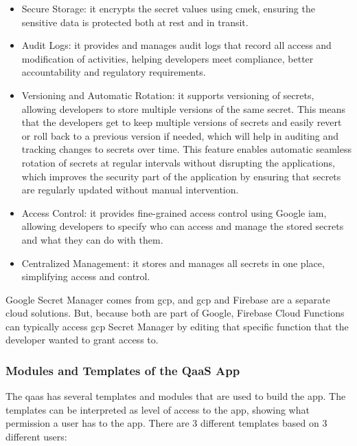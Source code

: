 \begin{multicols}{2}
      \begin{itemize}
            \item Secure Storage: it encrypts the secret values using \acrshort{cmek}, ensuring the sensitive data is protected
                  both at rest and in transit.
            \item Audit Logs: it provides and manages audit logs that record all access and modification of activities, helping
                  developers meet compliance, better accountability and regulatory requirements.
            \item Versioning and Automatic Rotation: it supports versioning of secrets, allowing developers to store multiple versions
                  of the same secret. This means that the developers get to keep multiple versions of secrets and easily revert or roll
                  back to a previous version if needed, which will help in auditing and tracking changes to secrets over time. This feature
                  enables automatic seamless rotation of secrets at regular intervals without  disrupting the applications, which improves
                  the security part of the application by ensuring that secrets are regularly updated without manual intervention.
            \item Access Control: it provides fine-grained access control using Google \acrshort{iam}, allowing developers to specify
                  who can access and manage the stored secrets and what they can do with them.
            \item Centralized Management: it stores and manages all secrets in one place, simplifying access and control.
      \end{itemize}

      Google Secret Manager comes from \acrshort{gcp}, and \acrshort{gcp} and Firebase are a separate cloud solutions. But, because
      both are part of Google, Firebase Cloud Functions can typically access \acrshort{gcp} Secret Manager by editing that specific function
      that the developer wanted to grant access to.

      \subsubsection{Modules and Templates of the QaaS App}

      The \acrshort{qaas} has several templates and modules that are used to build the app. The templates can be
      interpreted as level of access to the app, showing what permission a user has to the app. There are 3 different
      templates based on 3 different users:


\end{multicols}
